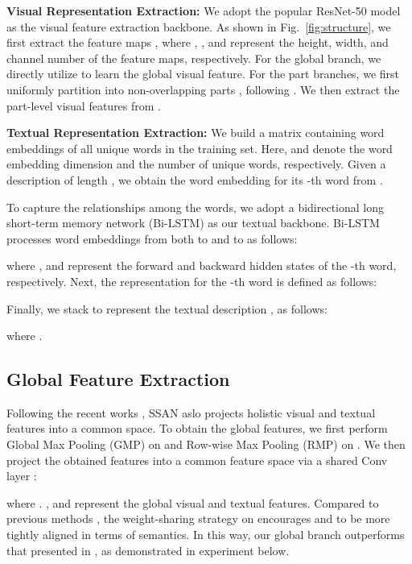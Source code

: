 \documentclass[journal]{IEEEtran}
\begin{document}
\noindent
\textbf{Visual Representation Extraction:} We adopt the popular ResNet-50 \cite{he2016deep} model as the visual feature extraction backbone. As shown in Fig.~\ref{fig:structure}, we first extract the feature maps , where , , and  represent the height, width, and channel number of the feature maps, respectively. For the global branch, we directly utilize  to learn the global visual feature. For the part branches, we first uniformly partition  into  non-overlapping parts , following \cite{sun2018beyond}. We then extract the part-level visual features from .

\noindent
\textbf{Textual Representation Extraction:} We build a matrix  containing word embeddings of all unique words in the training set. Here,  and  denote the word embedding dimension and the number of unique words, respectively. Given a description  of length , we obtain the word embedding   for its -th word from .

To capture the relationships among the words, we adopt a bidirectional long short-term memory network (Bi-LSTM) \cite{hochreiter1997long} as our textual backbone. Bi-LSTM processes word embeddings from both  to  and  to  as follows:


where ,  and represent the forward and backward hidden states of the -th word, respectively. Next, the representation for the -th word is defined as follows:


Finally, we stack   to represent the textual description , as follows:

where .

\subsection{Global Feature Extraction}
\label{sec:globalFea}
Following the recent works \cite{jing2020pose,niu2020improving,wang2020vitaa}, SSAN aslo projects holistic visual and textual features into a common space. To obtain the global features, we first perform Global Max Pooling (GMP) on  and Row-wise Max Pooling (RMP) on . We then project the obtained features into a common feature space via a shared  Conv layer :


where . ,  and represent the global visual and textual features. Compared to previous methods \cite{jing2020pose,wang2020vitaa}, the weight-sharing strategy on  encourages  and  to be more tightly aligned in terms of semantics. In this way, our global branch outperforms that presented in \cite{jing2020pose,wang2020vitaa}, as demonstrated in experiment below.
\end{document}
